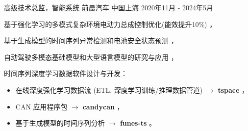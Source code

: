 \documentclass[../cv_xin_cn.tex]{subfiles}
\begin{document}


\begin{cventries}

  \cventry
    {高级技术总监，智能系统} %
    {前晨汽车} %
    {中国上海} %
    {2020年11月 - 2024年5月} %
    {
      \begin{cvitems} %
          \item 基于强化学习的多模式复杂环境电动力总成控制优化(能效提升10\%) \supercite{Xin_VEOS_22} \supercite{Xin_Fu_Pan_Simulation_Test_RL_22} \supercite{Pan_Xin_DrvStyle_23}，
          \item 基于生成模型的时间序列异常检测和电池安全状态预测 \supercite{Xin_GenAI_23} \supercite{Xin_Chen_NN_TSFeatures_23}，
          \item 自动驾驶多模态基础模型和大型语言模型的研究与应用 \supercite{Xin_LLM_24} \supercite{Xin_VLM_24} \supercite{Xin_Latent_Diffusion_23}，
          \item 时间序列深度学习数据软件设计与开发：
            \begin{itemize}
                    \item 在线深度强化学习数据流 (ETL, 深度学习训练/推理数据管道) $\rightarrow$ \textbf{tspace} \href{https://binjian.github.io/tspace/}{\faGithub}，
                    \item CAN 应用程序包 $\rightarrow$ \textbf{candycan} \href{https://binjian.github.io/candycan/}{\faGithub}，
                    \item 基于生成模型的时间序列分析 $\rightarrow$ \textbf{funes-ts} \href{https://github.com/binjian/funes-ts/}{\faGithub}。
            \end{itemize}
      \end{cvitems}
    }


\end{cventries}
\end{document}

